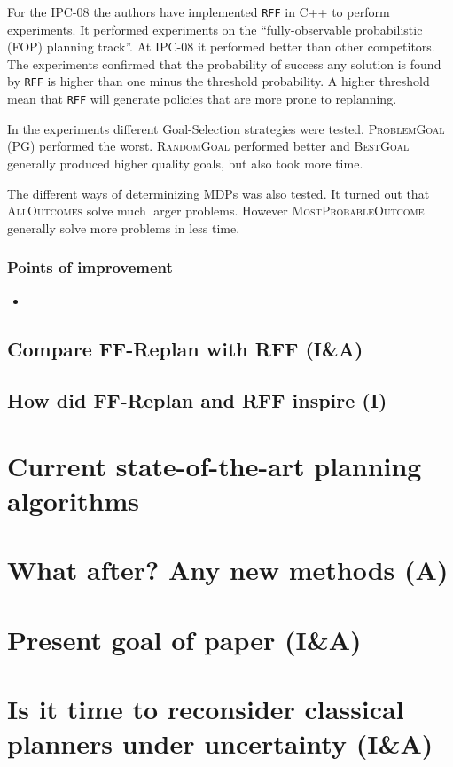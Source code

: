 \documentclass[runningheads,a4paper]{llncs}
\begin{document}
For the IPC-08 the authors have implemented \texttt{RFF} in C++ to perform
experiments. It performed experiments on the ``fully-observable probabilistic
(FOP) planning track''. At IPC-08 it performed better than other competitors.
The experiments confirmed that the probability of success any solution is found
by \texttt{RFF} is higher than one minus the threshold probability. A higher
threshold mean that \texttt{RFF} will generate policies that are more prone to
replanning.

In the experiments different Goal-Selection strategies were tested.
\textsc{ProblemGoal} (PG) performed the worst. \textsc{RandomGoal} performed
better and \textsc{BestGoal} generally produced higher quality goals, but also
took more time.

The different ways of determinizing MDPs was also tested. It turned out that
\textsc{AllOutcomes} solve much larger problems. However
\textsc{MostProbableOutcome} generally solve more problems in less time.

\subsubsection{Points of improvement}

\begin{itemize}
	\item
\end{itemize}

\subsection{Compare FF-Replan with RFF (I\&A)}

\subsection{How did FF-Replan and RFF inspire (I)}

\section{Current state-of-the-art planning algorithms}

\section{What after? Any new methods (A)}

\section{Present goal of paper (I\&A)}

\section{Is it time to reconsider classical planners under uncertainty (I\&A)}



\end{document}
